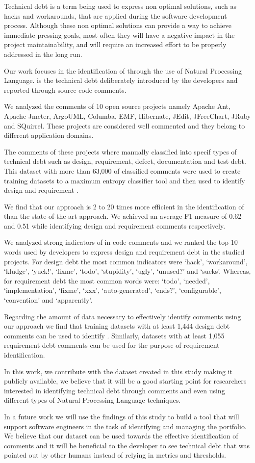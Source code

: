 Technical debt is a term being used to express non optimal solutions, such as hacks and workarounds, that are applied during the software development process. Although these non optimal solutions can provide a way to achieve immediate pressing goals, most often they will have a negative impact in the project maintainability, and will require an increased effort to be properly addressed in the long run. 

Our work focuses in the identification of \SATD through the use of Natural Processing Language. \SATD is the technical debt deliberately introduced by the developers and reported through source code comments.

We analyzed the comments of 10 open source projects namely Apache Ant, Apache Jmeter, ArgoUML, Columba, EMF, Hibernate, JEdit, JFreeChart, JRuby and SQuirrel. These projects are considered well commented and they belong to different application domains.

The comments of these projects where manually classified into specif types of technical debt such as design, requirement, defect, documentation and test debt. This dataset with more than 63,000 of classified comments were used to create training datasets to a maximum entropy classifier tool and then used to identify  design and requirement \SATD.

We find that our approach is 2 to 20 times more efficient in the identification of \SATD than the state-of-the-art approach. We achieved an average F1 measure of 0.62 and 0.51 while identifying design and requirement \SATD comments respectively. 

We analyzed strong indicators of \SATD in code comments and we ranked the top 10 words used by developers to express design and requirement debt in the studied projects. For design debt the most common indicators were `hack', `workaround', `kludge', `yuck!', `fixme', `todo', `stupidity', `ugly', `unused?' and `sucks'. Whereas, for requirement debt the most common words were: `todo', `needed', `implementation', `fixme', `xxx', `auto-generated', `ends?', `configurable', `convention' and `apparently'.
 
Regarding the amount of data necessary to effectively identify \SATD comments using our approach we find that training datasets with at least 1,444 design debt comments can be used to identify \SATD. Similarly, datasets with at least 1,055 requirement debt comments can be used for the purpose of requirement \SATD identification. 

In this work, we contribute with the dataset created in this study making it publicly available, we believe that it will be a good starting point for researchers interested in identifying technical debt through comments and even using different types of Natural Processing Language techniques. 

In a future work we will use the findings of this study to build a tool that will support software engineers in the task of identifying and managing the \SATD portfolio. We believe that our dataset can be used towards the effective identification of \SATD comments and it will be beneficial to the developer to see technical debt that was pointed out by other humans instead of relying in metrics and thresholds. 